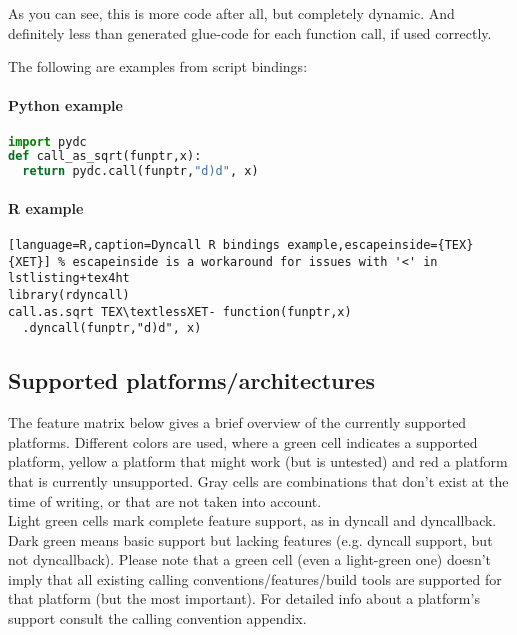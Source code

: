 As you can see, this is more code after all, but completely dynamic.
And definitely less than generated glue-code for each function call, if
used correctly.

The following are examples from script bindings:

\paragraph{Python example}

\begin{lstlisting}[language=python,caption=Dyncall Python bindings example]
import pydc
def call_as_sqrt(funptr,x):
  return pydc.call(funptr,"d)d", x)
\end{lstlisting}


\paragraph{R example}

\begin{lstlisting}[language=R,caption=Dyncall R bindings example,escapeinside={TEX}{XET}] % escapeinside is a workaround for issues with '<' in lstlisting+tex4ht
library(rdyncall)
call.as.sqrt TEX\textlessXET- function(funptr,x)
  .dyncall(funptr,"d)d", x)
\end{lstlisting}


\pagebreak

\subsection{Supported platforms/architectures}

The feature matrix below gives a brief overview of the currently supported
platforms. Different colors are used, where a green cell indicates a supported
platform, yellow a platform that might work (but is untested) and red a platform
that is currently unsupported. Gray cells are combinations that don't exist
at the time of writing, or that are not taken into account.\\
Light green cells mark complete feature support, as in dyncall and dyncallback. Dark green means basic support but lacking features (e.g. dyncall support, but not dyncallback).
Please note that a green cell (even a light-green one) doesn't imply that all existing calling conventions/features/build tools are supported for that platform (but the most
important).
For detailed info about a platform's support consult the calling convention appendix.

